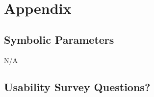 \documentclass[12pt, titlepage]{article}
\begin{document}
					

					
					
					



    



\newpage
				






\newpage

\section{Appendix} \label{section:6}

\subsection{Symbolic Parameters}  \label{section:6.1}

N/A

\subsection{Usability Survey Questions?} \label{section:6.2}

\end{document}
